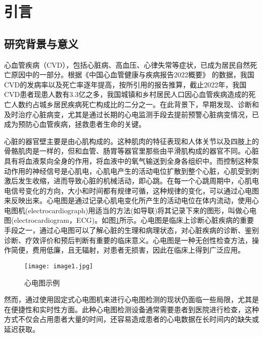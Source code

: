\section{引言}
\subsection{研究背景与意义}

心血管疾病（CVD），包括心脏病、高血压、心律失常等症状，已成为居民自然死亡原因中的一部分。根据《中国心血管健康与疾病报告2022概要》 \cite{中国心血管健康与疾病报告2022概要} 的数据，我国CVD的发病率以及死亡率逐年提高，按所引用的报告推算，截止2022年，我国CVD患者现患人数有3.3亿之多，我国城镇和乡村居民人口因心血管疾病造成的死亡人数约占城乡居民疾病死亡构成比的二分之一。在此背景下，早期发现、诊断和及时治疗心脏病变，尤其是通过长期的心电监测手段去提前预警心脏病变情况，已成为预防心血管疾病，拯救患者生命的关键。

心脏的器官壁主要是由心肌构成的。这种肌肉的特征表现和人体关节以及四肢上的骨骼肌肉是一样的，但和血管、肠胃等器官里那些由平滑肌构成的器官不同。心脏具有将血液泵向全身的作用，将血液中的氧气输送到全身各组织中。而控制这种泵动作用的神经信号是心肌电，心肌电产生的活动电位扩散到整个心脏，心肌受到刺激后发生收缩，进而导致心脏的机械活动，即心跳。在每一个心跳周期中，心肌电电信号变化的方向，大小和时间都有规律可循，这种规律的变化，可以通过心电图来反映出来。心电图是通过记录心肌电变化所产生的活动电位在体内流动，使用心电图机(electrocardiograph)用适当的方法(如导联)将其记录下来的图形，叫做心电图(electrocardiogram，ECG)\cite{便携式心电和脉搏监测装置设计}。如图\ref{F.ECG_image}所示。心电图是临床上诊断心脏疾病的重要手段之一，通过心电图可以了解心脏的生理和病理状态，对心脏疾病的诊断、鉴别诊断、疗效评价和预后判断有重要的临床意义。心电图是一种无创性检查方法，操作简便，费用低廉，且无辐射，对患者无损害，因此在临床上得到广泛应用。\cite{单导联长程心电监测筛查心房颤动的有效性研究}

\begin{figure}[hbt]
    \centering
    \texttt{[image: image1.jpg]}
    \caption{心电图示例}
    \label{F.ECG_image}
\end{figure}

然而，通过使用固定式心电图机来进行心电图检测的现状仍面临一些局限，尤其是在便捷性和实时性方面。此种心电图检测设备通常需要患者到医院进行检查，这种方式不仅会占用患者大量的时间，还容易造成患者的心电数据在长时间内的缺失或延迟获取。

